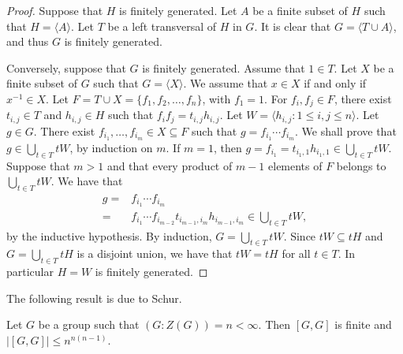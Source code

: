 \begin{proof}
Suppose that $H$ is finitely generated. Let $A$ be a finite subset of $H$ such that $H=\langle A\rangle$.  
Let $T$ be a left transversal of $H$ in $G$. It is clear that $G=\langle T\cup A\rangle$, and thus $G$ is finitely generated.

Conversely, suppose that $G$ is finitely generated. Assume that  $1\in T$. Let $X$ be a finite subset of $G$ such that $G=\langle X\rangle$. We assume that $x\in X$ if and only if $x^{-1}\in X$. Let $F=T\cup X=\{ f_1,f_2,\dots ,f_n\}$, with $f_1=1$. For $f_i,f_j\in F$, there exist $t_{i,j}\in T$ and $h_{i,j}\in  H$ such that $f_if_j=t_{i,j}h_{i,j}$. Let $W=\langle h_{i,j} : 1\leq i,j\leq n\rangle$.  Let $g\in G$. There exist $f_{i_1},\dots ,f_{i_m}\in X\subseteq F$ such that $g=f_{i_1}\cdots f_{i_m}$. We shall prove that $g\in\bigcup_{t\in T}tW$, by induction on $m$. If $m=1$, then $g=f_{i_1}=t_{i_1,1}h_{i_1,1}\in \bigcup_{t\in T}tW$. Suppose that $m>1$ and that every product of $m-1$ elements of $F$ belongs to $\bigcup_{t\in T}tW$. We have that
\begin{align*}
    g=&f_{i_1}\cdots f_{i_m}\\
    =&f_{i_1}\cdots f_{i_{m-2}}t_{i_{m-1},i_m}h_{i_{m-1},i_m}\in\bigcup_{t\in T}tW,
\end{align*}
by the inductive hypothesis. By induction, $G=\bigcup_{t\in T}tW$. Since
$tW\subseteq tH$ and $G=\bigcup_{t\in T}tH$ is a disjoint union, we have that $tW=tH$ for all $t\in T$. In particular $H=W$ is finitely generated.
\end{proof}

The following result is due to Schur.
\begin{lemma}\label{lem:Schurcenter}
Let $G$ be a group such that $(G:Z(G))=n<\infty$. Then $[G,G]$ is finite and $|[G,G]|\leq n^{n(n-1)}$.
\end{lemma}

